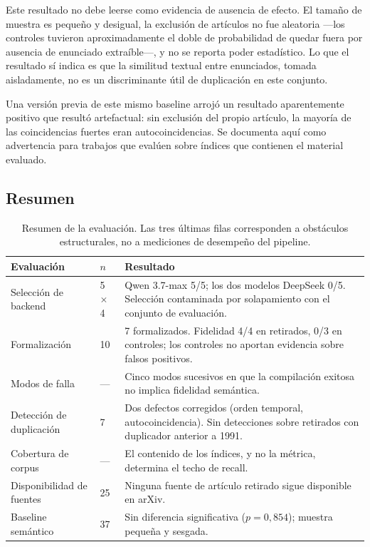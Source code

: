 \documentclass[12pt,a4paper]{article}
\theoremstyle{remark}
\begin{document}
Este resultado no debe leerse como evidencia de ausencia de efecto. El tamaño de muestra es pequeño y desigual, la exclusión de artículos no fue aleatoria —los controles tuvieron aproximadamente el doble de probabilidad de quedar fuera por ausencia de enunciado extraíble—, y no se reporta poder estadístico. Lo que el resultado sí indica es que la similitud textual entre enunciados, tomada aisladamente, no es un discriminante útil de duplicación en este conjunto.

Una versión previa de este mismo baseline arrojó un resultado aparentemente positivo que resultó artefactual: sin exclusión del propio artículo, la mayoría de las coincidencias fuertes eran autocoincidencias. Se documenta aquí como advertencia para trabajos que evalúen sobre índices que contienen el material evaluado.

\subsection{Resumen}

\begin{table}[htbp]
\centering
\small
\setlength{\tabcolsep}{4pt}
\renewcommand{\arraystretch}{1.15}
\begin{tabular}{p{3.6cm}p{1.6cm}p{8.6cm}}
\toprule
Evaluación & $n$ & Resultado \\
\midrule
Selección de backend & 5 $\times$ 4 & Qwen 3.7-max 5/5; los dos modelos DeepSeek 0/5. Selección contaminada por solapamiento con el conjunto de evaluación. \\
\addlinespace
Formalización & 10 & 7 formalizados. Fidelidad 4/4 en retirados, 0/3 en controles; los controles no aportan evidencia sobre falsos positivos. \\
\addlinespace
Modos de falla & --- & Cinco modos sucesivos en que la compilación exitosa no implica fidelidad semántica. \\
\addlinespace
Detección de duplicación & 7 & Dos defectos corregidos (orden temporal, autocoincidencia). Sin detecciones sobre retirados con duplicador anterior a 1991. \\
\addlinespace
Cobertura de corpus & --- & El contenido de los índices, y no la métrica, determina el techo de recall. \\
\addlinespace
Disponibilidad de fuentes & 25 & Ninguna fuente de artículo retirado sigue disponible en arXiv. \\
\addlinespace
Baseline semántico & 37 & Sin diferencia significativa ($p = 0{,}854$); muestra pequeña y sesgada. \\
\bottomrule
\end{tabular}
\caption{Resumen de la evaluación. Las tres últimas filas corresponden a obstáculos estructurales, no a mediciones de desempeño del pipeline.}
\label{tab:resumen}
\end{table}
\end{document}
